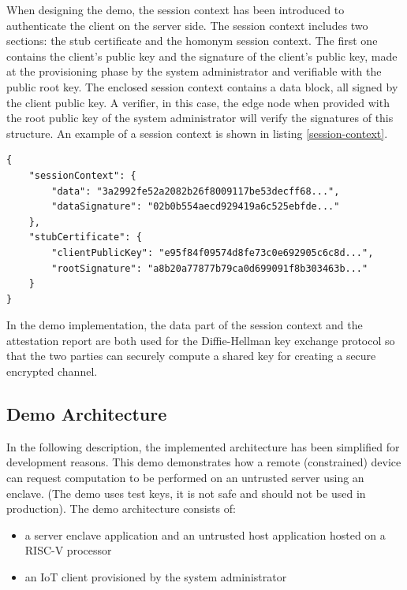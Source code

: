 When designing the demo, the session context has been introduced to authenticate the client on the server side. The session context includes two sections: the stub certificate and the homonym session context. The first one contains the client's public key and the signature of the client's public key, made at the provisioning phase by the system administrator and verifiable with the public root key. The enclosed session context contains a data block, all signed by the client public key. A verifier, in this case, the edge node when provided with the root public key of the system administrator will verify the signatures of this structure. An example of a session context is shown in listing \ref{session-context}. \\

\begin{lstlisting}[caption={Example of a session context generated by the client},captionpos=b,style=json, label={session-context},frame=single]
{
    "sessionContext": {
        "data": "3a2992fe52a2082b26f8009117be53decff68...",
        "dataSignature": "02b0b554aecd929419a6c525ebfde..."
    },
    "stubCertificate": {
        "clientPublicKey": "e95f84f09574d8fe73c0e692905c6c8d...",
        "rootSignature": "a8b20a77877b79ca0d699091f8b303463b..."
    }
}
\end{lstlisting}

In the demo implementation, the data part of the session context and the attestation report are both used for the Diffie-Hellman key exchange protocol so that the two parties can securely compute a shared key for creating a secure encrypted channel. 

\subsection{Demo Architecture}
In the following description, the implemented architecture has been simplified for development reasons. This demo demonstrates how a remote (constrained) device can request computation to be performed on an untrusted server using an enclave. (The demo uses test keys, it is not safe and should not be used in production). The demo architecture consists of:
\begin{itemize}
    \item a server enclave application and an untrusted host application hosted on a RISC-V processor
    \item an IoT client provisioned by the system administrator  
\end{itemize} 

